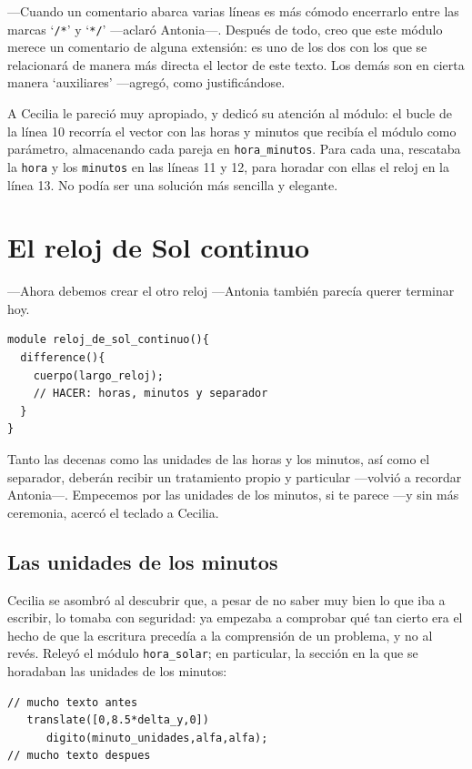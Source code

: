 ---Cuando un comentario abarca varias líneas es más cómodo encerrarlo
entre las marcas `\lstinline!/*!' y `\lstinline!*/!'  ---aclaró
An\-to\-nia---. Después de todo, creo que este módulo merece un
comentario de alguna extensión: es uno de los dos con los que se
relacionará de manera más directa el lector de este texto.  Los demás
son en cierta manera `auxiliares' ---agregó, como justificándose.

A Cecilia le pareció muy apropiado, y dedicó su atención al módulo: el
bucle de la línea 10 recorría el vector con las horas y minutos que
recibía el módulo como parámetro, almacenando cada pareja en
\lstinline!hora_minutos!. Para cada una, rescataba la \lstinline!hora!
y los \lstinline!minutos! en las líneas 11 y 12, para horadar con ellas
el reloj en la línea 13. No podía ser una solución más sencilla y
elegante.


\section{El reloj de Sol continuo}

---Ahora debemos crear el otro reloj ---Antonia también parecía querer
terminar hoy.


\begin{lstlisting}
module reloj_de_sol_continuo(){
  difference(){
    cuerpo(largo_reloj);    
    // HACER: horas, minutos y separador
  }
}
\end{lstlisting}%

\guillemotright Tanto las decenas como las unidades de las horas y los
minutos, así como el separador, deberán recibir un tratamiento propio
y particular ---volvió a recordar Antonia---.  Empecemos por las
unidades de los minutos, si te parece ---y sin más ceremonia, acercó
el teclado a Cecilia.

\subsection{Las unidades de los minutos}

Cecilia se asombró al descubrir que, a pesar de no saber muy bien lo
que iba a escribir, lo tomaba con seguridad: ya empezaba a comprobar
qué tan cierto era el hecho de que la escritura precedía a la
comprensión de un problema, y no al revés.  Releyó el módulo
\lstinline!hora_solar!; en particular, la sección en la que se
horadaban las unidades de los minutos:

\begin{lstlisting}
// mucho texto antes
   translate([0,8.5*delta_y,0])
      digito(minuto_unidades,alfa,alfa);  
// mucho texto despues
\end{lstlisting}

